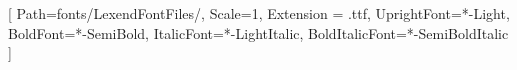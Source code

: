 


\setmainfont{Lexend}[
    Path=fonts/LexendFontFiles/,
    Scale=1,
    Extension = .ttf,
    UprightFont=*-Light,
    BoldFont=*-SemiBold,
    ItalicFont=*-LightItalic,
    BoldItalicFont=*-SemiBoldItalic
    ]

